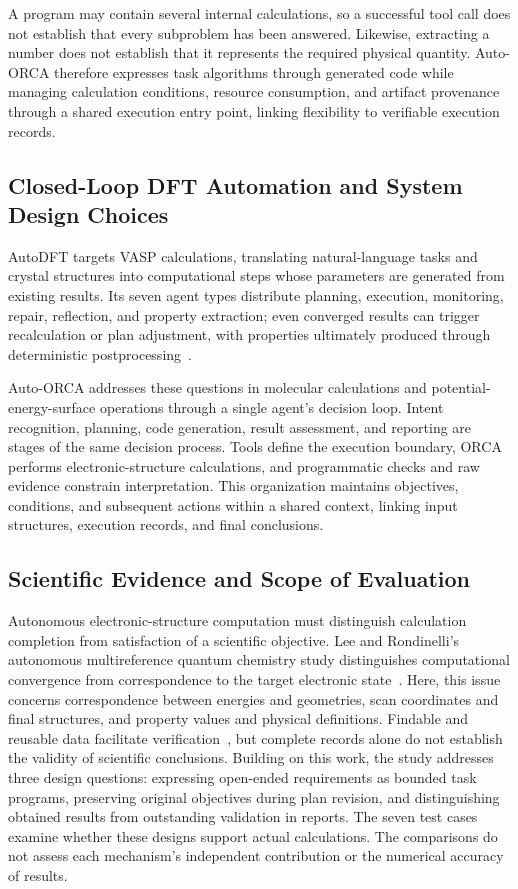 A program may contain several internal calculations, so a successful tool call does not establish that every subproblem has been answered.
Likewise, extracting a number does not establish that it represents the required physical quantity.
Auto-ORCA therefore expresses task algorithms through generated code while managing calculation conditions, resource consumption, and artifact provenance through a shared execution entry point, linking flexibility to verifiable execution records.

\subsection{Closed-Loop DFT Automation and System Design Choices}
AutoDFT targets VASP calculations, translating natural-language tasks and crystal structures into computational steps whose parameters are generated from existing results.
Its seven agent types distribute planning, execution, monitoring, repair, reflection, and property extraction; even converged results can trigger recalculation or plan adjustment, with properties ultimately produced through deterministic postprocessing~\cite{autodft}.

Auto-ORCA addresses these questions in molecular calculations and potential-energy-surface operations through a single agent's decision loop.
Intent recognition, planning, code generation, result assessment, and reporting are stages of the same decision process.
Tools define the execution boundary, ORCA performs electronic-structure calculations, and programmatic checks and raw evidence constrain interpretation.
This organization maintains objectives, conditions, and subsequent actions within a shared context, linking input structures, execution records, and final conclusions.

\subsection{Scientific Evidence and Scope of Evaluation}
Autonomous electronic-structure computation must distinguish calculation completion from satisfaction of a scientific objective.
Lee and Rondinelli's autonomous multireference quantum chemistry study distinguishes computational convergence from correspondence to the target electronic state~\cite{multirefagent}.
Here, this issue concerns correspondence between energies and geometries, scan coordinates and final structures, and property values and physical definitions.
Findable and reusable data facilitate verification~\cite{fair}, but complete records alone do not establish the validity of scientific conclusions.
Building on this work, the study addresses three design questions: expressing open-ended requirements as bounded task programs, preserving original objectives during plan revision, and distinguishing obtained results from outstanding validation in reports.
The seven test cases examine whether these designs support actual calculations.
The comparisons do not assess each mechanism's independent contribution or the numerical accuracy of results.

